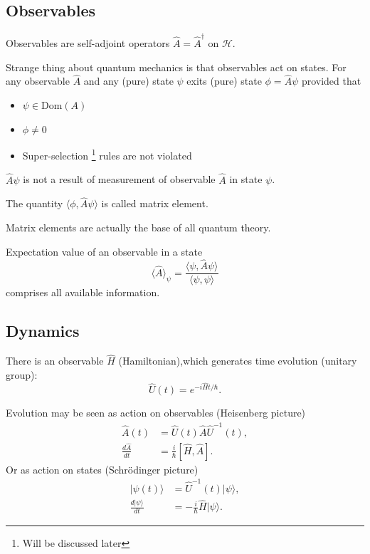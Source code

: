 \subsection{Observables}
    \label{cq:obs}
\begin{axiom}[Observables]
Observables are self-adjoint operators $ \hat A= \hat A^\dagger$ on $\mathcal H$.
\end{axiom}
Strange thing about quantum mechanics is that observables act on states.
For any observable $ \hat A $ and any (pure) state $ \psi $ exits (pure)
state $ \phi = \hat A \psi $ provided that
\begin{itemize}
    \item $ \psi \in \text{Dom}(A) $
    \item $ \phi \neq 0 $
    \item Super-selection \footnote{Will be discussed later} rules are not violated
\end{itemize}
\begin{remark}
    $  \hat A \psi$ is not a result of measurement of observable  $ \hat A $ in
    state $ \psi $.
\end{remark}
\begin{definition}
    The quantity $ \langle \phi,\hat A \psi \rangle $ is called matrix element.
\end{definition}  
Matrix elements are actually the base of all quantum theory. 
\begin{axiom}
    Expectation value of an observable in a state 
    \begin{equation}
       \label {cq:exp1}
    \langle \hat A \rangle_\psi = \frac{\langle \psi, \hat A \psi \rangle} {\langle \psi,\psi \rangle}
    \end{equation}
    comprises all available information.
\end{axiom}

\subsection{Dynamics}
    \label{cq:dyn}
    There is an observable $ \hat H$ (Hamiltonian),which generates time evolution
    (unitary group):
    \begin{equation}
       \label {cq:evol}
 \hat U(t) = e^{-i \hat Ht/\hbar}.
    \end{equation}

    Evolution may be seen as action on observables (Heisenberg picture)
\begin{align}
   \hat A(t)&= \hat U(t) \hat A \hat U^{-1}(t), \label {cq:heis1}\\
    \frac{d \hat A}{d t} &= \frac{i}{\hbar}[\hat H,\hat A].\label{cq:heis2}
\end{align}
    Or as action on states (Schr\"odinger picture)
\begin{align}
    |\psi(t)\rangle&= \hat U^{-1}(t) |\psi \rangle, \label{cq:schr1} \\
    \frac{d |\psi \rangle}{d t} &=-\frac{i}{\hbar} \hat H |\psi \rangle. \label{cq:schr2}
\end{align}
   
